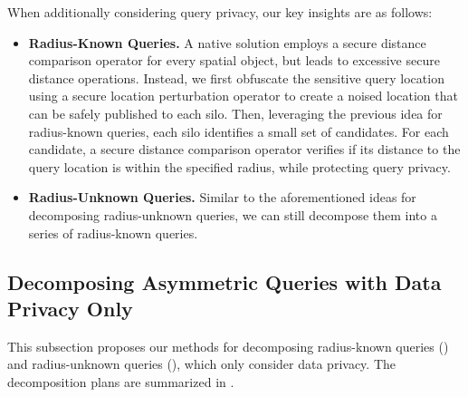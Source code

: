 When additionally considering query privacy, our key insights are as follows:
\begin{itemize}
    \item \textbf{Radius-Known Queries.}
    A native solution employs a secure distance comparison operator for every spatial object, but leads to excessive secure distance operations.
    Instead, we first obfuscate the sensitive query location using a secure location perturbation operator to create a noised location that can be safely published to each silo. 
    Then, leveraging the previous idea for radius-known queries, each silo identifies a small set of candidates. 
    For each candidate, a secure distance comparison operator verifies if its distance to the query location is within the specified radius, while protecting query privacy.
    
    \item \textbf{Radius-Unknown Queries.}
    Similar to the aforementioned ideas for decomposing radius-unknown queries, we can still decompose them into a series of radius-known queries.
\end{itemize}

\subsection{Decomposing Asymmetric Queries with Data Privacy Only}
\label{sec:asymmetric}

This subsection proposes our methods for decomposing radius-known queries () and radius-unknown queries (), which only consider data privacy.
The decomposition plans are summarized in .


